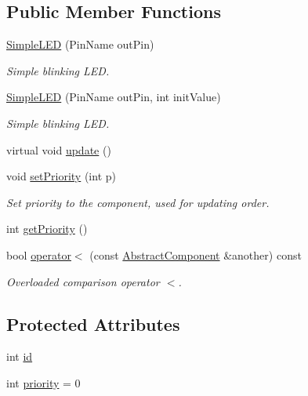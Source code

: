 \subsection*{Public Member Functions}
\begin{DoxyCompactItemize}
\item 
\hyperlink{class_simple_l_e_d_afec6f532dbc735f2fd95a2d080e7398d}{Simple\+L\+ED} (Pin\+Name out\+Pin)
\begin{DoxyCompactList}\small\item\em Simple blinking L\+ED. \end{DoxyCompactList}\item 
\hyperlink{class_simple_l_e_d_a035610e281499c6a1160b2ae6b2797f0}{Simple\+L\+ED} (Pin\+Name out\+Pin, int init\+Value)
\begin{DoxyCompactList}\small\item\em Simple blinking L\+ED. \end{DoxyCompactList}\item 
virtual void \hyperlink{class_simple_l_e_d_a1642dc4aca42ad46e5663a39cdda005f}{update} ()
\item 
void \hyperlink{class_abstract_component_a58a59a9ea6c3b4c86fb3bf98ff1eaaef}{set\+Priority} (int p)
\begin{DoxyCompactList}\small\item\em Set priority to the component, used for updating order. \end{DoxyCompactList}\item 
int \hyperlink{class_abstract_component_ac0b440d1d642ff1292ec3c544d75a8f1}{get\+Priority} ()
\item 
bool \hyperlink{class_abstract_component_a0c2e458144111c5f599c66f168516abc}{operator$<$} (const \hyperlink{class_abstract_component}{Abstract\+Component} \&another) const
\begin{DoxyCompactList}\small\item\em Overloaded comparison operator \textquotesingle{}$<$\textquotesingle{}. \end{DoxyCompactList}\end{DoxyCompactItemize}
\subsection*{Protected Attributes}
\begin{DoxyCompactItemize}
\item 
int \hyperlink{class_abstract_component_a9c9c548149681b1a1dd935e66ed5dd11}{id}
\item 
int \hyperlink{class_abstract_component_aff57dfa5f31be093a06b55560e33fb95}{priority} = 0
\end{DoxyCompactItemize}
